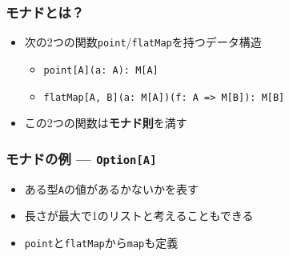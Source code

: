 \begin{frame}
  \frametitle{モナドとは？}

  \begin{itemize}
    \item<2-> 次の2つの関数\lstinline|point|/\lstinline|flatMap|を持つデータ構造
    \begin{itemize}
      \item<3-> \lstinline|point[A](a: A): M[A]|
      \item<3-> \lstinline|flatMap[A, B](a: M[A])(f: A => M[B]): M[B]|
    \end{itemize}
    \item<4-> この2つの関数は\textbf{モナド則}を満す
  \end{itemize}


\end{frame}

\begin{frame}
  \frametitle{モナドの例 --- \protect\lstinline|Option[A]|}

  \begin{itemize}
    \item<2-> ある型\lstinline|A|の値があるかないかを表す
    \item<3-> 長さが最大で1のリストと考えることもできる
  \end{itemize}


  \begin{itemize}
    \item<5-> \lstinline|point|と\lstinline|flatMap|から\lstinline|map|も定義
  \end{itemize}
\end{frame}

